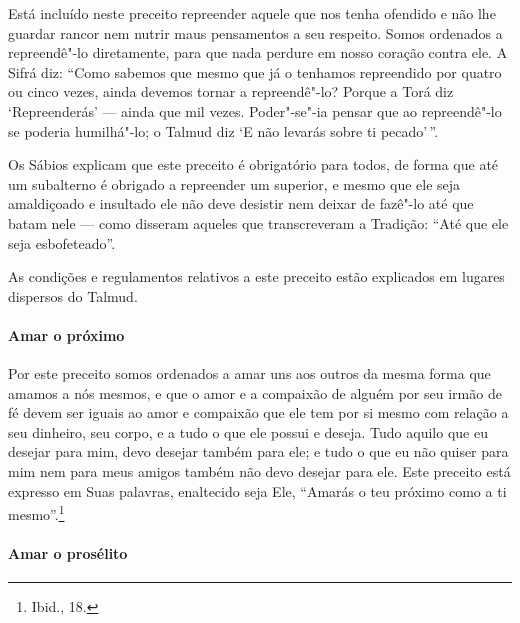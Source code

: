 \begin{multicols}{2}
Está incluído neste preceito repreender aquele que nos tenha ofendido e
não lhe guardar rancor nem nutrir maus pensamentos a seu respeito. Somos
ordenados a repreendê"-lo diretamente, para que nada perdure em nosso
coração contra ele. A Sifrá\starr{} diz: ``Como sabemos que mesmo que já o
tenhamos repreendido por quatro ou cinco vezes, ainda devemos tornar a
repreendê"-lo? Porque a Torá\starr{} diz `Repreenderás' --- ainda que mil vezes.
Poder"-se"-ia pensar que ao repreendê"-lo se poderia humilhá"-lo; o Talmud\starr{}
diz `E não levarás sobre ti pecado'\,''.

Os Sábios explicam que este preceito é obrigatório para todos, de forma
que até um subalterno é obrigado a repreender um superior, e mesmo que
ele seja amaldiçoado e insultado ele não deve desistir nem deixar de
fazê"-lo até que batam nele --- como disseram aqueles que transcreveram a
Tradição: ``Até que ele seja esbofeteado''.

As condições e regulamentos relativos a este preceito estão explicados
em lugares dispersos do Talmud\starr.

\paragraph{Amar o próximo}

Por este preceito somos ordenados a amar uns aos outros da mesma forma
que amamos a nós mesmos, e que o amor e a compaixão de alguém por seu
irmão de fé devem ser iguais ao amor e compaixão que ele tem por si
mesmo com relação a seu dinheiro, seu corpo, e a tudo o que ele possui e
deseja. Tudo aquilo que eu desejar para mim, devo desejar também para
ele; e tudo o que eu não quiser para mim nem para meus amigos também não
devo desejar para ele. Este preceito está expresso em Suas palavras,
enaltecido seja Ele, ``Amarás o teu próximo como a ti mesmo''.\footnote{Ibid.,
18.}

\paragraph{Amar o prosélito}


\end{multicols}
